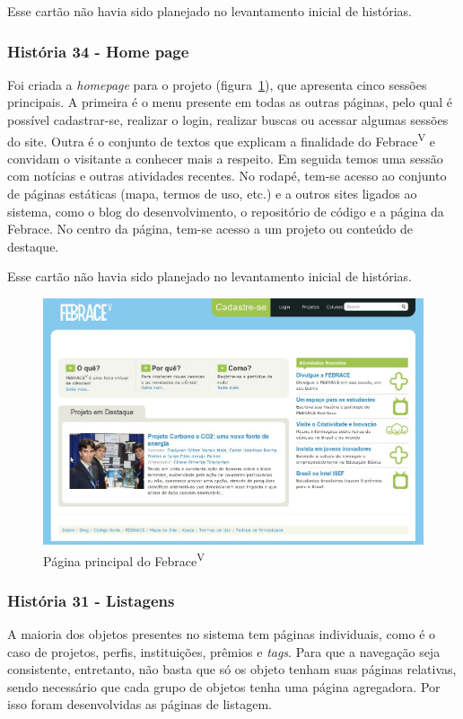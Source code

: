   Esse cartão não havia sido planejado no levantamento inicial de histórias.

    \subsubsection{História 34 - Home page}
      Foi criada a \textit{homepage} para o projeto (figura~\ref{homepage}), que apresenta cinco sessões principais. A primeira é o menu presente em todas as outras páginas, pelo qual é possível cadastrar-se, realizar o login, realizar buscas ou acessar algumas sessões do site. Outra é o conjunto de textos que explicam a finalidade do Febrace\textsuperscript{V} e convidam o visitante a conhecer mais a respeito. Em seguida temos uma sessão com notícias e outras atividades recentes. No rodapé, tem-se acesso ao conjunto de páginas estáticas (mapa, termos de uso, etc.) e a outros sites ligados ao sistema, como o blog do desenvolvimento, o repositório de código e a página da Febrace. No centro da página, tem-se acesso a um projeto ou conteúdo de destaque.

  Esse cartão não havia sido planejado no levantamento inicial de histórias.

    \begin{figure}
        \begin{center}
    \includegraphics[width=1.0\linewidth]{arquivos/home.png}
        \end{center}
        \caption{Página principal do Febrace\textsuperscript{V}}
        \label{homepage}
    \end{figure}

    \subsubsection{História 31 - Listagens}
      A maioria dos objetos presentes no sistema tem páginas individuais, como é o caso de projetos, perfis, instituições, prêmios e \textit{tags}. Para que a navegação seja consistente, entretanto, não basta que só os objeto tenham suas páginas relativas, sendo necessário que cada grupo de objetos tenha uma página agregadora. Por isso foram desenvolvidas as páginas de listagem.


